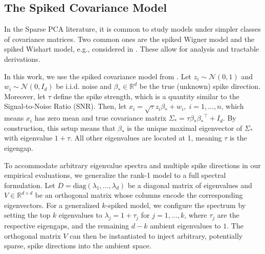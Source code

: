 \documentclass{article}
\begin{document}
\subsection{The Spiked Covariance Model}\label{app:spiked_cov}
In the Sparse PCA literature, it is common to study models under simpler classes of covariance matrices. Two common ones are the spiked Wigner model and the spiked Wishart model, e.g., considered in \cite{deshpande_information-theoretically_2014}. These allow for analysis and tractable derivations. 

In this work, we use the spiked covariance model from \cite[ch. 8.2.2]{wainwright_high-dimensional_2019}. Let $z_i \sim \mathcal{N}(0,1)$ and \mbox{$w_i \sim \mathcal{N}(0,I_d)$} be i.i.d. noise and $\beta_*\in \mathbb{R}^d$ be the true (unknown) spike direction. Moreover, let $\tau$ define the spike strength, which is a quantity similar to the Signal-to-Noise Ratio (SNR). Then, let \mbox{$x_i = \sqrt{\tau} z_i \beta_* + w_i, \; i=1,\dots,n$}, which means $x_i$ has zero mean and true covariance matrix $\Sigma_* = \tau \beta_* {\beta_*}^\top + I_d$. By construction, this setup means that $\beta_*$ is the unique maximal eigenvector of $\Sigma_*$ with eigenvalue $1+\tau$. All other eigenvalues are located at 1, meaning $\tau$ is the eigengap. 

To accommodate arbitrary eigenvalue spectra and multiple spike directions in our empirical evaluations, we generalize the rank-1 model to a full spectral formulation. Let $D = \mathrm{diag}(\lambda_1, \dots, \lambda_d)$ be a diagonal matrix of eigenvalues and $V \in \mathbb{R}^{d \times d}$ be an orthogonal matrix whose columns encode the corresponding eigenvectors. For a generalized $k$-spiked model, we configure the spectrum by setting the top $k$ eigenvalues to $\lambda_j = 1 + \tau_j$ for $j=1,\dots,k$, where $\tau_j$ are the respective eigengaps, and the remaining $d-k$ ambient eigenvalues to $1$. The orthogonal matrix $V$ can then be instantiated to inject arbitrary, potentially sparse, spike directions into the ambient space.
\end{document}

